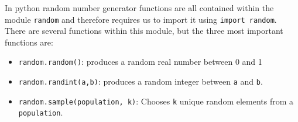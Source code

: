   In python random number generator functions are all contained within the module \verb|random| and therefore requires us to import it using \verb|import random|. There are several functions within this module, but the three most important functions are:
  \begin{itemize}
    \setlength\itemsep{0em}
    \item \verb|random.random()|: produces a random real number between 0 and 1
    \item \verb|random.randint(a,b)|: produces a random integer between \verb|a| and \verb|b|.
    \item \verb|random.sample(population, k)|: Chooses \verb|k| unique random elements from a \verb|population|.
  \end{itemize}

